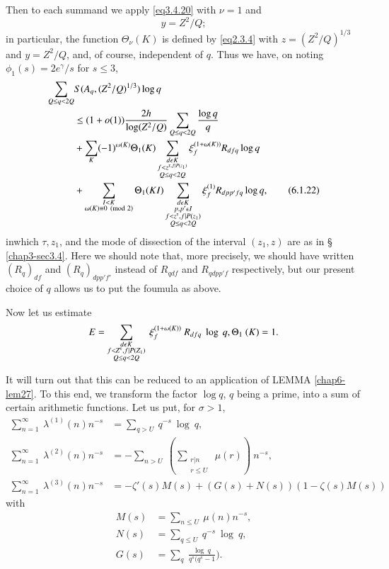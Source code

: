 Then to each summand we apply \eqref{eq3.4.20} with $\nu = 1$ and 
\begin{equation*}
y = Z^2/Q; \tag{6.1.21}\label{eq6.1.21}
\end{equation*}
in particular, the function $\Theta_{\nu} (K)$ is defined by \eqref{eq2.3.4}
with $z = (Z^2/Q)^{1/3}$ and $y = Z^2/Q$, and, of course, independent
of $q$. Thus we have, on noting $\phi_1(s) = 2e^{\gamma}/s$ for $s
\leq 3$, 
\begin{align*}
 \sum_{Q \leq q < 2Q} & S(A_q, (Z^2/Q)^{1/3}) \log q\\
   &\leq (1 + o(1)) \frac{2h}{\log (Z^2/Q)}\sum_{Q\leq q < 2Q} \frac{\log q}{q}\\
   &+ \sum_K (-1)^{\omega (K)}\Theta_1 (K) \sum_{\substack{d
      \epsilon  K \\ f < z^{\tauup, f | P(z_1)} \\ Q \leq q < 2Q}}
  \xi_f^{(1 + \omega (K) )} R_{dfq} \log q\\ 
   &+ \sum_{\substack{I < K \\ \omega (K) \equiv 0 \pmod{2}}} \Theta_1
  (KI) \sum_{\substack{d \epsilon  K \\ p, p' \epsilon  I\\ f <
      z^{\tauup},f | P(z_1)\\Q \leq q < 2Q}} \xi^{(1)}_f  R_{dpp' fq}
  \log q, \tag{6.1.22} \label{eq6.1.22}
\end{align*}
in\pageoriginale which $\tau, z_1$, and the mode of dissection of the interval
$(z_1, z)$ are as in \S~ \ref{chap3-sec3.4}. Here we should note that, more
precisely, we should have written $(R_q)_{df}$ and $(R_q)_{dpp'f'}$
instead of $R_{qdf}$ and $R_{qdpp'f}$ respectively, but our present
choice of $q$ allows us to put the foumula as above. 

Now let us estimate
$$
E = \sum_{\substack{d \epsilon  K\\f < Z^{\tauup},f | P(Z_1)\\Q \le
    q < 2Q}} ~ \xi^{(1+\omega(K))}_f~ R_{dfq} ~ \log~ q,  \Theta_1~(K)
= 1. 
$$

It will turn out that this can be reduced to an application of LEMMA
\ref{chap6-lem27}. To this end, we transform the factor $\log q$, $q$
being a prime, 
into a sum of certain arithmetic functions. Let us put, for $\sigma >
1$, 
\begin{align*}
\sum^{\infty}_{n=1} ~ \lambda^{(1)}(n)n^{-s} & = \sum_{q > U} ~ q^{-s}~ \log ~ q,\\
\sum^{\infty}_{n=1} ~ \lambda^{(2)}(n)n^{-s} &= -\sum_{n > U} ~
(\sum_{\substack{r | n \\ r \leq U}}~\mu (r) ) ~ n^{-s},\\ 
\sum^{\infty}_{n=1} ~ \lambda^{(3)}(n)n^{-s} & = - \zeta'(s)M(s) +
(G(s) + N(s))(1-\zeta (s)M(s))\tag{6.1.23}\label{eq6.1.23}
\end{align*}
with
\begin{align*}
M(s) & = \sum_{n \leq U} ~ \mu(n)n^{-s},\\
N(s) & = \sum_{q \leq U} ~ q^{-s} ~ \log ~ q,\\
G(s) & = \sum_{q} ~ \frac{ \log ~ q}{q^s(q^s - 1}).
\end{align*}\pageoriginale

